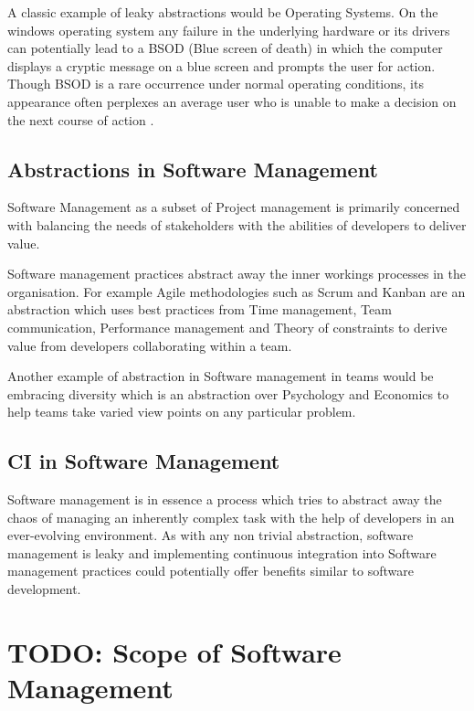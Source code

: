 \documentclass[12pt,conference]{IEEEtran}
\begin{document}
A classic example of leaky abstractions would be Operating Systems. On the windows operating system any failure in the underlying hardware or its drivers can potentially lead to a BSOD (Blue screen of death) in which the computer displays a cryptic message on a blue screen and prompts the user for action. Though BSOD is a rare occurrence under normal operating conditions, its appearance often perplexes an average user who is unable to make a decision on the next course of action \cite{rosenberg_law_2007}. 

\subsection*{Abstractions in Software Management}

Software Management as a subset of Project management is primarily concerned with balancing the needs of stakeholders with the abilities of developers to deliver value.

Software management practices abstract away the inner workings processes in the organisation. For example Agile methodologies such as Scrum and Kanban are an abstraction which uses best practices from Time management, Team communication, Performance management and Theory of constraints to derive value from developers collaborating within a team. 

Another example of abstraction in Software management in teams would be embracing diversity which is an abstraction over Psychology and Economics to help teams take varied view points on any particular problem. 

\subsection*{CI in Software Management}

Software management is in essence a process which tries to abstract away the chaos of managing an inherently complex task with the help of developers in an ever-evolving environment. As with any non trivial abstraction, software management is leaky and implementing continuous integration into Software management practices could potentially offer benefits similar to software development.



\section*{TODO: Scope of Software Management}
\end{document}
